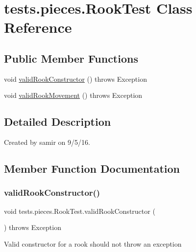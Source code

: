 \hypertarget{classtests_1_1pieces_1_1_rook_test}{}\section{tests.\+pieces.\+Rook\+Test Class Reference}
\label{classtests_1_1pieces_1_1_rook_test}
\subsection*{Public Member Functions}
\begin{DoxyCompactItemize}
\item 
void \hyperlink{classtests_1_1pieces_1_1_rook_test_af9fc3b1f6a4fbc8e9312842ca0b8b595}{valid\+Rook\+Constructor} ()  throws Exception 
\item 
void \hyperlink{classtests_1_1pieces_1_1_rook_test_aca9621adf1a4fbe5911ab3b4b1edfee2}{valid\+Rook\+Movement} ()  throws Exception 
\end{DoxyCompactItemize}


\subsection{Detailed Description}
Created by samir on 9/5/16. 

\subsection{Member Function Documentation}
\hypertarget{classtests_1_1pieces_1_1_rook_test_af9fc3b1f6a4fbc8e9312842ca0b8b595}{}\label{classtests_1_1pieces_1_1_rook_test_af9fc3b1f6a4fbc8e9312842ca0b8b595} 
\subsubsection{\texorpdfstring{valid\+Rook\+Constructor()}{validRookConstructor()}}
{\footnotesize\ttfamily void tests.\+pieces.\+Rook\+Test.\+valid\+Rook\+Constructor (\begin{DoxyParamCaption}{ }\end{DoxyParamCaption}) throws Exception}

Valid constructor for a rook should not throw an exception \hypertarget{classtests_1_1pieces_1_1_rook_test_aca9621adf1a4fbe5911ab3b4b1edfee2}{}\label{classtests_1_1pieces_1_1_rook_test_aca9621adf1a4fbe5911ab3b4b1edfee2} 
